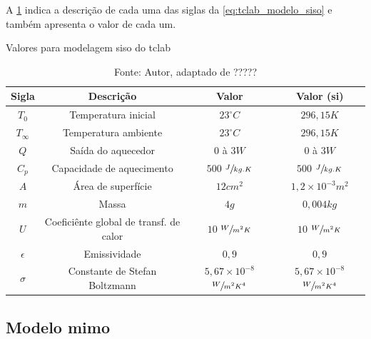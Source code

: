 A \cref{tab:tclab_modelo_siso_valores} indica a descrição de cada uma das siglas da
\cref{eq:tclab_modelo_siso} e também apresenta o valor de cada um.

\begin{table}[h]
	\centering
	\caption{Valores para modelagem \acrshort{siso} do \acrshort{tclab}}
	\label{tab:tclab_modelo_siso_valores}
	\begin{tabular}{cccc} \toprule
		{Sigla} 		& {Descrição} 								& {Valor} 											& {Valor (\acrshort{si})} 							\\ \midrule
		$T_{0}$ 		& Temperatura inicial 						& $23^\circ C$ 										& $296{,}15 K $										\\
		$T_{\infty}$	& Temperatura ambiente						& $23^\circ C$										& $296{,}15 K $										\\
		$Q$				& Saída do aquecedor						& $0$ à $3 W$										& $0$ à $3 W$										\\
		$C_p$			& Capacidade de aquecimento					& $500$ $\sfrac{J}{kg.K}$							& $500$ $\sfrac{J}{kg.K}$							\\
		$A$				& Área de superfície						& $12 cm^{2}$										& $1{,}2{\times}10^{-3} m^{2}$						\\
		$m$				& Massa										& $4 g$												& $0{,}004 kg	$									\\
		$U$				& Coeficiênte global de transf. de calor	& $10$ $\sfrac{W}{m^{2}K}$							& $10$ $\sfrac{W}{m^{2}K}$							\\
		$\epsilon$		& Emissividade								& $0{,}9$											& $0{,}9$											\\
		$\sigma$		& Constante de Stefan Boltzmann				& $5{,}67{\times}10^{-8}$ $\sfrac{W}{m^{2}K^{4}}$	& $5{,}67{\times}10^{-8}$ $\sfrac{W}{m^{2}K^{4}}$	\\ \bottomrule
	\end{tabular}
	\caption*{Fonte: Autor, adaptado de ?????}		%
\end{table}

\subsection{Modelo \acrshort{mimo}}
\label{subsec:tclab_modelo_mimo}

